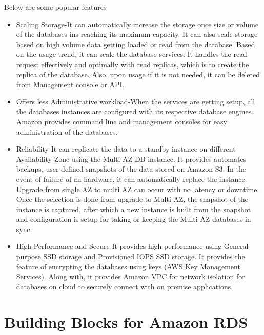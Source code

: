 Below are some popular features 
\begin{itemize}
	
\item Scaling Storage-It can automatically increase the storage once size or 
volume of the databases ins reaching its maximum capacity. It can also 
scale storage based on high volume data getting loaded or read 
from the database. Based on the usage trend, it can scale the database 
services. It handles the read request effectively and optimally with read 
replicas, which is to create the replica of the database. Also, upon usage 
if it is not needed, it can be deleted from Management console or API.

\item Offers less Administrative workload-When the services are getting setup, 
all the databases instances are configured with its respective database 
engines. Amazon provides command line and management consoles for easy 
administration of the databases.

\item Reliability-It can replicate the data to a standby instance on different 
Availability Zone using the Multi-AZ DB instance. It provides  automates 
backups, user defined snapshots of the data stored on Amazon S3. In the 
event of failure of an hardware, it can automatically replace the instance. 
Upgrade from single AZ to multi AZ can occur with no latency or downtime. 
Once the selection is done from upgrade to Multi AZ, the snapshot of the 
instance is captured, after which a new instance is built from the snapshot 
and configuration is setup for taking or keeping the 
Multi AZ databases in sync.
~\cite{hid-sp18-520-amazonrdsfaqs}

\item High Performance and Secure-It provides high performance using General 
purpose SSD storage and Provisioned IOPS SSD storage. It provides the feature 
of encrypting the databases using keys (AWS Key Management Services). 
Along with, it provides Amazon VPC for network isolation for databases on 
cloud to securely connect with on premise applications.

\end{itemize}

\section{Building Blocks for Amazon RDS}

